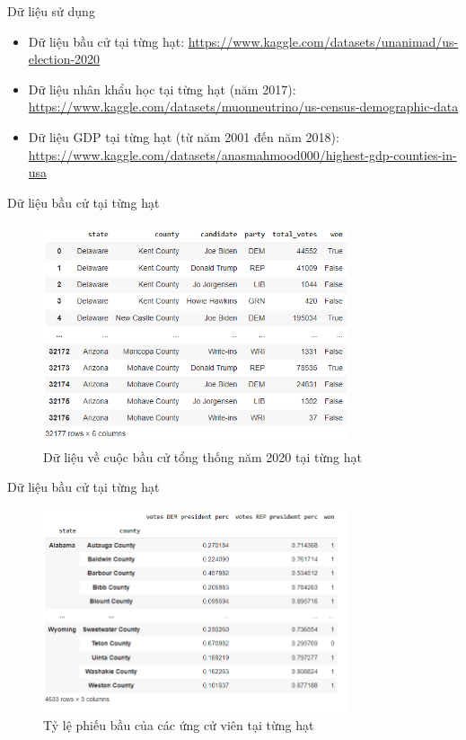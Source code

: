 \documentclass[10pt]{beamer}
\theoremstyle{remark}
\theoremstyle{definition}
\begin{document}
\begin{frame}{Dữ liệu sử dụng}
    \begin{itemize}
        \item Dữ liệu bầu cử tại từng hạt: \url{https://www.kaggle.com/datasets/unanimad/us-election-2020}
        \item Dữ liệu nhân khẩu học tại từng hạt (năm 2017): \url{https://www.kaggle.com/datasets/muonneutrino/us-census-demographic-data}
        \item Dữ liệu GDP tại từng hạt (từ năm 2001 đến năm 2018): \url{https://www.kaggle.com/datasets/anasmahmood000/highest-gdp-counties-in-usa}
    \end{itemize}
\end{frame}


\begin{frame}{Dữ liệu bầu cử tại từng hạt}
	\begin{figure}[h!]
        \centering
        \includegraphics[width=0.8\textwidth]{figures/President_Dataframe.png}
        \caption{Dữ liệu về cuộc bầu cử tổng thống năm 2020 tại từng hạt}
    \end{figure}
\end{frame}

\begin{frame}{Dữ liệu bầu cử tại từng hạt}
	\begin{figure}[h!]
        \centering
        \includegraphics[width=0.8\textwidth]{figures/President_Dataframe_Rep_Dem_Percentage.png}
        \caption{Tỷ lệ phiếu bầu của các ứng cử viên tại từng hạt}
    \end{figure}
\end{frame}
\end{document}
